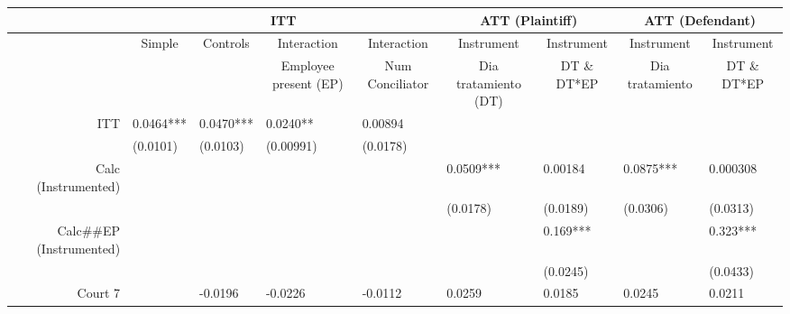 \begin{tabular}{rrrrrrrrr}
\toprule
      & \multicolumn{4}{c}{ITT}       & \multicolumn{2}{c}{ATT (Plaintiff)} & \multicolumn{2}{c}{ATT (Defendant)} \\
\midrule
      & \multicolumn{1}{c}{Simple} & \multicolumn{1}{c}{Controls} & \multicolumn{1}{c}{Interaction} & \multicolumn{1}{c}{Interaction} & \multicolumn{1}{c}{Instrument} & \multicolumn{1}{c}{Instrument} & \multicolumn{1}{c}{Instrument} & \multicolumn{1}{c}{Instrument} \\
      \midrule
      \midrule
      & \multicolumn{1}{c}{} & \multicolumn{1}{c}{} & \multicolumn{1}{c}{Employee present (EP)} & \multicolumn{1}{c}{Num Conciliator} & \multicolumn{1}{c}{Dia tratamiento (DT)} & \multicolumn{1}{c}{DT \& DT*EP} & \multicolumn{1}{c}{Dia tratamiento} & \multicolumn{1}{c}{DT \& DT*EP} \\
      \midrule
      \midrule
ITT   & \multicolumn{1}{l}{0.0464***} & \multicolumn{1}{l}{0.0470***} & \multicolumn{1}{l}{0.0240**} & \multicolumn{1}{l}{0.00894} & \multicolumn{1}{l}{} & \multicolumn{1}{l}{} & \multicolumn{1}{l}{} & \multicolumn{1}{l}{} \\
      & \multicolumn{1}{l}{(0.0101)} & \multicolumn{1}{l}{(0.0103)} & \multicolumn{1}{l}{(0.00991)} & \multicolumn{1}{l}{(0.0178)} & \multicolumn{1}{l}{} & \multicolumn{1}{l}{} & \multicolumn{1}{l}{} & \multicolumn{1}{l}{} \\
Calc (Instrumented) & \multicolumn{1}{l}{} & \multicolumn{1}{l}{} & \multicolumn{1}{l}{} & \multicolumn{1}{l}{} & \multicolumn{1}{l}{0.0509***} & \multicolumn{1}{l}{0.00184} & \multicolumn{1}{l}{0.0875***} & \multicolumn{1}{l}{0.000308} \\
      & \multicolumn{1}{l}{} & \multicolumn{1}{l}{} & \multicolumn{1}{l}{} & \multicolumn{1}{l}{} & \multicolumn{1}{l}{(0.0178)} & \multicolumn{1}{l}{(0.0189)} & \multicolumn{1}{l}{(0.0306)} & \multicolumn{1}{l}{(0.0313)} \\
Calc\#\#EP (Instrumented) & \multicolumn{1}{l}{} & \multicolumn{1}{l}{} & \multicolumn{1}{l}{} & \multicolumn{1}{l}{} & \multicolumn{1}{l}{} & \multicolumn{1}{l}{0.169***} & \multicolumn{1}{l}{} & \multicolumn{1}{l}{0.323***} \\
      & \multicolumn{1}{l}{} & \multicolumn{1}{l}{} & \multicolumn{1}{l}{} & \multicolumn{1}{l}{} & \multicolumn{1}{l}{} & \multicolumn{1}{l}{(0.0245)} & \multicolumn{1}{l}{} & \multicolumn{1}{l}{(0.0433)} \\
Court 7 & \multicolumn{1}{l}{} & \multicolumn{1}{l}{-0.0196} & \multicolumn{1}{l}{-0.0226} & \multicolumn{1}{l}{-0.0112} & \multicolumn{1}{l}{0.0259} & \multicolumn{1}{l}{0.0185} & \multicolumn{1}{l}{0.0245} & \multicolumn{1}{l}{0.0211} \\

\end{tabular}
